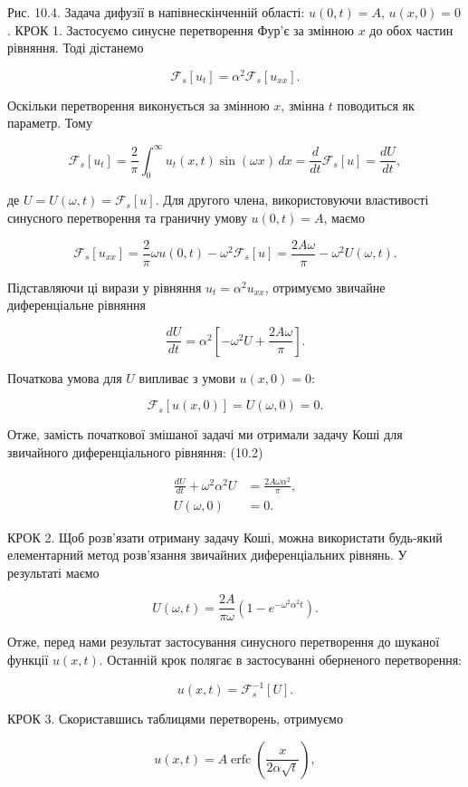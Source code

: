 \documentclass[
  ukrainian,
]{article}
\begin{document}
Рис. 10.4. Задача дифузії в напівнескінченній області: \(u(0,t)=A\),
\(u(x,0)=0\). КРОК 1. Застосуємо синусне перетворення Фур'є за змінною
\(x\) до обох частин рівняння. Тоді дістанемо

\[
\mathcal{F}_s[u_t] = \alpha^2 \mathcal{F}_s[u_{xx}].
\]

Оскільки перетворення виконується за змінною \(x\), змінна \(t\)
поводиться як параметр. Тому

\[
\mathcal{F}_s[u_t]
= \frac{2}{\pi}\int_{0}^{\infty} u_t(x,t)\sin(\omega x)\,dx
= \frac{d}{dt}\mathcal{F}_s[u]
= \frac{dU}{dt},
\]

де \(U=U(\omega,t)=\mathcal{F}_s[u]\). Для другого члена, використовуючи
властивості синусного перетворення та граничну умову \(u(0,t)=A\), маємо

\[
\mathcal{F}_s[u_{xx}] = \frac{2}{\pi}\omega u(0,t) - \omega^2 \mathcal{F}_s[u]
= \frac{2A\omega}{\pi} - \omega^2 U(\omega,t).
\]

Підставляючи ці вирази у рівняння \(u_t=\alpha^2 u_{xx}\), отримуємо
звичайне диференціальне рівняння

\[
\frac{dU}{dt} = \alpha^2\left[-\omega^2 U + \frac{2A\omega}{\pi}\right].
\]

Початкова умова для \(U\) випливає з умови \(u(x,0)=0\):

\[
\mathcal{F}_s[u(x,0)] = U(\omega,0) = 0.
\]

Отже, замість початкової змішаної задачі ми отримали задачу Коші для
звичайного диференціального рівняння: (10.2)

\[
\begin{aligned}
\frac{dU}{dt} + \omega^2 \alpha^2 U &= \frac{2A\omega \alpha^2}{\pi}, \\
U(\omega,0) &= 0.
\end{aligned}
\]

КРОК 2. Щоб розв'язати отриману задачу Коші, можна використати будь-який
елементарний метод розв'язання звичайних диференціальних рівнянь. У
результаті маємо

\[
U(\omega,t)=\frac{2A}{\pi\omega}\left(1-e^{-\omega^2\alpha^2 t}\right).
\]

Отже, перед нами результат застосування синусного перетворення до
шуканої функції \(u(x,t)\). Останній крок полягає в застосуванні
оберненого перетворення:

\[
u(x,t)=\mathcal{F}_s^{-1}[U].
\]

КРОК 3. Скориставшись таблицями перетворень, отримуємо

\[
u(x,t)=A\operatorname{erfc}\!\left(\frac{x}{2\alpha\sqrt{t}}\right),
\]
\end{document}
